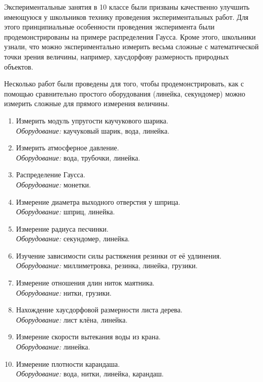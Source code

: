 Экспериментальные занятия в 10 классе были призваны качественно
улучшить имеющуюся у школьников технику проведения экспериментальных
работ. Для этого принципиальные особенности проведения эксперимента
были продемонстрированы на примере распределения Гаусса. Кроме этого,
школьники узнали, что можно экспериментально измерить весьма сложные с
математической точки зрения величины, например, хаусдорфову
размерность природных объектов.

Несколько работ были проведены для того, чтобы продемонстрировать, как
с помощью сравнительно простого оборудования (линейка, секундомер)
можно измерить сложные для прямого измерения величины. 

\begin{enumerate}
\item Измерить модуль упругости каучукового шарика. \\
  \textit{Оборудование:} каучуковый шарик, вода, линейка.
\item Измерить атмосферное давление. \\ \textit{Оборудование:} вода, трубочки, линейка.
\item Распределение Гаусса. \\ \textit{Оборудование:} монетки.
\item Измерение диаметра выходного отверстия у шприца. \\
  \textit{Оборудование:} шприц, линейка.
\item Измерение радиуса песчинки. \\ \textit{Оборудование:}
  секундомер, линейка.
\item Изучение зависимости силы растяжения резинки от её удлинения. \\
  \textit{Оборудование:} миллиметровка, резинка, линейка, грузики.
\item Измерение отношения длин ниток маятника. \\ \textit{Оборудование:} нитки,
  грузики.
\item Нахождение хаусдорфовой размерности листа дерева. \\
  \textit{Оборудование:} лист клёна, линейка.
\item Измерение скорости вытекания воды из крана. \\
  \textit{Оборудование:} линейка.
\item Измерение плотности карандаша. \\ \textit{Оборудование:} вода,
  нитки, линейка, карандаш. 
\end{enumerate}


